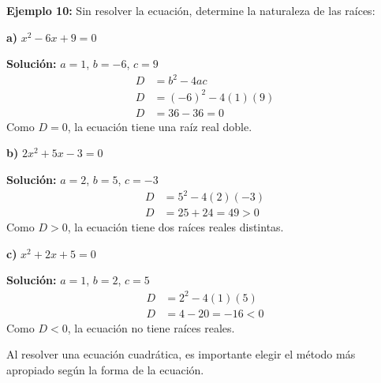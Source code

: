 \begin{example}
\textbf{Ejemplo 10:} Sin resolver la ecuación, determine la naturaleza de las raíces:

\textbf{a)} $x^2 - 6x + 9 = 0$

\textbf{Solución:} $a = 1$, $b = -6$, $c = 9$
\begin{align}
D &= b^2 - 4ac\\
D &= (-6)^2 - 4(1)(9)\\
D &= 36 - 36 = 0
\end{align}
Como $D = 0$, la ecuación tiene una raíz real doble.

\textbf{b)} $2x^2 + 5x - 3 = 0$

\textbf{Solución:} $a = 2$, $b = 5$, $c = -3$
\begin{align}
D &= 5^2 - 4(2)(-3)\\
D &= 25 + 24 = 49 > 0
\end{align}
Como $D > 0$, la ecuación tiene dos raíces reales distintas.

\textbf{c)} $x^2 + 2x + 5 = 0$

\textbf{Solución:} $a = 1$, $b = 2$, $c = 5$
\begin{align}
D &= 2^2 - 4(1)(5)\\
D &= 4 - 20 = -16 < 0
\end{align}
Como $D < 0$, la ecuación no tiene raíces reales.
\end{example}

\newpage

Al resolver una ecuación cuadrática, es importante elegir el método más apropiado según la forma de la ecuación.


